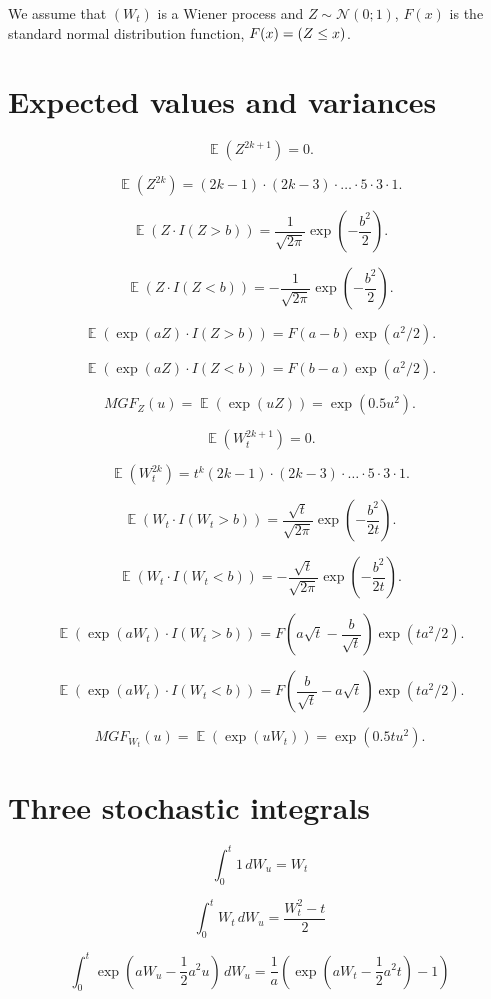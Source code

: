 \documentclass[12pt]{article} %
\theoremstyle{definition} %
\DeclareMathOperator{\E}{\mathbb{E}}
\let\P\relax
\DeclareMathOperator{\P}{\mathbb{P}}
\newcommand \cN{\mathcal{N}}
\begin{document}
We assume that $(W_t)$ is a Wiener process and $Z\sim \cN(0;1)$, $F(x)$ is the standard normal distribution function, $F(x) = \P(Z \leq x)$.


\section*{Expected values and variances}

\[
\E(Z^{2k+1}) = 0.
\]


\[
\E(Z^{2k}) = (2k-1) \cdot (2k-3) \cdot \ldots \cdot 5 \cdot 3 \cdot 1.    
\]


\[
\E(Z \cdot I(Z > b)) = \frac{1}{\sqrt{2\pi}}\exp(-\frac{b^2}{2}).    
\]

\[
\E(Z \cdot I(Z < b)) = - \frac{1}{\sqrt{2\pi}}\exp(-\frac{b^2}{2}).     
\]

\[
\E(\exp(aZ) \cdot I(Z > b)) =  F(a-b)\exp(a^2/2).
\]

\[
\E(\exp(aZ) \cdot I(Z < b)) =  F(b-a)\exp(a^2/2).
\]



\[
MGF_Z(u) = \E(\exp(u Z)) = \exp(0.5 u^2).
\]


\[
\E(W_t^{2k+1}) = 0.
\]


\[
\E(W_t^{2k}) = t^k (2k-1) \cdot (2k-3) \cdot \ldots \cdot 5 \cdot 3 \cdot 1.    
\]


\[
\E(W_t \cdot I(W_t > b)) = \frac{\sqrt{t}}{\sqrt{2\pi}}\exp(-\frac{b^2}{2t}).    
\]

\[
\E(W_t \cdot I(W_t < b)) = -\frac{\sqrt{t}}{\sqrt{2\pi}}\exp(-\frac{b^2}{2t}).    
\]

\[
\E(\exp(aW_t) \cdot I(W_t > b)) =   F\left(a\sqrt{t}-\frac{b}{\sqrt{t}}\right)\exp(ta^2/2).
\]

\[
\E(\exp(aW_t) \cdot I(W_t < b)) =   F\left(\frac{b}{\sqrt{t}}-a\sqrt{t}\right)\exp(ta^2/2).
\]



\[
MGF_{W_t}(u) = \E(\exp(u W_t)) = \exp(0.5 t u^2).
\]


\section*{Three stochastic integrals}

\[
    \int_0^t 1 \, dW_u = W_t
\]

\[
    \int_0^t W_t \, dW_u = \frac{W_t^2 - t}{2}
\]

\[
    \int_0^t \exp(aW_u -\frac{1}{2} a^2 u) \, dW_u = \frac{1}{a}\left(\exp(aW_t - \frac{1}{2}a^2 t) - 1\right) 
\]
\end{document}
